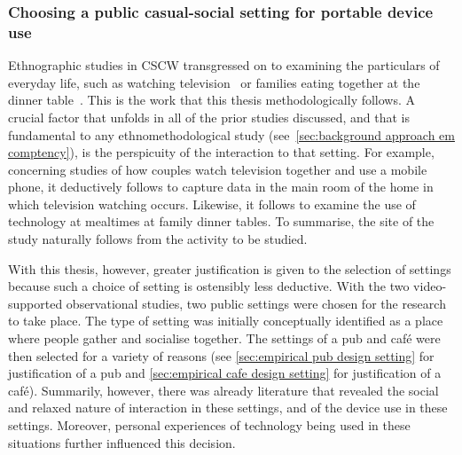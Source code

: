 


\crpagebreak\subsubsection{Choosing a public casual-social setting for portable device use}\label{sec:synopsis discussion method setting public}
\begin{revisedsubmission}
Ethnographic studies in \ac{CSCW} transgressed on to examining the particulars of everyday life, such as watching television~\citep{Rooksby2015} or families eating together at the dinner table~\citep{Ferdous2016}.
This is the work that this thesis methodologically follows.
A crucial factor that unfolds in all of the prior studies discussed, and that is fundamental to any ethnomethodological study (see~\ref{sec:background approach em comptency}), is the perspicuity of the interaction to that setting.
For example, concerning studies of how couples watch television together and use a mobile phone, it deductively follows to capture data in the main room of the home in which television watching occurs.
Likewise, it follows to examine the use of technology at mealtimes at family dinner tables.
To summarise, the site of the study naturally follows from the activity to be studied.

With this thesis, however, greater justification is given to the selection of settings because such a choice of setting is ostensibly less deductive. With the two video-supported observational studies, two public settings were chosen for the research to take place.
The type of setting was initially conceptually identified as a place where people gather and socialise together.
The settings of a pub and caf\'{e} were then selected for a variety of reasons (see \ref{sec:empirical pub design setting} for justification of a pub and \ref{sec:empirical cafe design setting} for justification of a caf\'{e}).
Summarily, however, there was already literature that revealed the social and relaxed nature of interaction in these settings, and of the device use in these settings.
Moreover, personal experiences of technology being used in these situations further influenced this decision.


\end{revisedsubmission}
